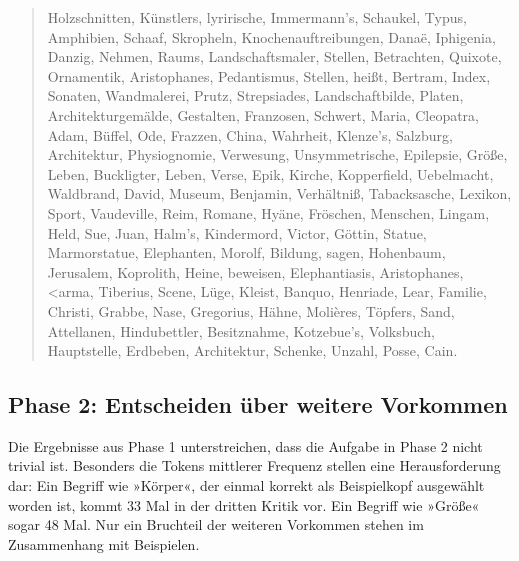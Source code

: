 \documentclass{article}
\begin{document}
\begin{quote}
  Holzschnitten, Künstlers, lyrirische, Immermann's, Schaukel, Typus,
  Amphibien, Schaaf, Skropheln, Knochenauftreibungen, Danaë,
  Iphigenia, Danzig, Nehmen, Raums, Landschaftsmaler, Stellen,
  Betrachten, Quixote, Ornamentik, Aristophanes, Pedantismus, Stellen,
  heißt, Bertram, Index, Sonaten, Wandmalerei, Prutz, Strepsiades,
  Landschaftbilde, Platen, Architekturgemälde, Gestalten, Franzosen,
  Schwert, Maria, Cleopatra, Adam, Büffel, Ode, Frazzen, China,
  Wahrheit, Klenze's, Salzburg, Architektur, Physiognomie, Verwesung,
  Unsymmetrische, Epilepsie, Größe, Leben, Buckligter, Leben, Verse,
  Epik, Kirche, Kopperfield, Uebelmacht, Waldbrand, David, Museum,
  Benjamin, Verhältniß, Tabacksasche, Lexikon, Sport, Vaudeville,
  Reim, Romane, Hyäne, Fröschen, Menschen, Lingam, Held, Sue, Juan,
  Halm's, Kindermord, Victor, Göttin, Statue, Marmorstatue,
  Elephanten, Morolf, Bildung, sagen, Hohenbaum, Jerusalem, Koprolith,
  Heine, beweisen, Elephantiasis, Aristophanes,
  \foreignlanguage{polutonikogreek}{<arma}, %
  Tiberius, Scene, Lüge, Kleist, Banquo, Henriade, Lear, Familie,
  Christi, Grabbe, Nase, Gregorius, Hähne, Molières, Töpfers, Sand,
  Attellanen, Hindubettler, Besitznahme, Kotzebue's, Volksbuch,
  Hauptstelle, Erdbeben, Architektur, Schenke, Unzahl, Posse, Cain.
\end{quote}

\subsection{Phase 2: Entscheiden über weitere Vorkommen}

Die Ergebnisse aus Phase 1 unterstreichen, dass die Aufgabe in Phase 2
nicht trivial ist. Besonders die Tokens mittlerer Frequenz stellen
eine Herausforderung dar: Ein Begriff wie »Körper«, der einmal korrekt
als Beispielkopf ausgewählt worden ist, kommt 33 Mal in der dritten
Kritik vor. Ein Begriff wie »Größe« sogar 48 Mal. Nur ein Bruchteil
der weiteren Vorkommen stehen im Zusammenhang mit Beispielen.
\end{document}
